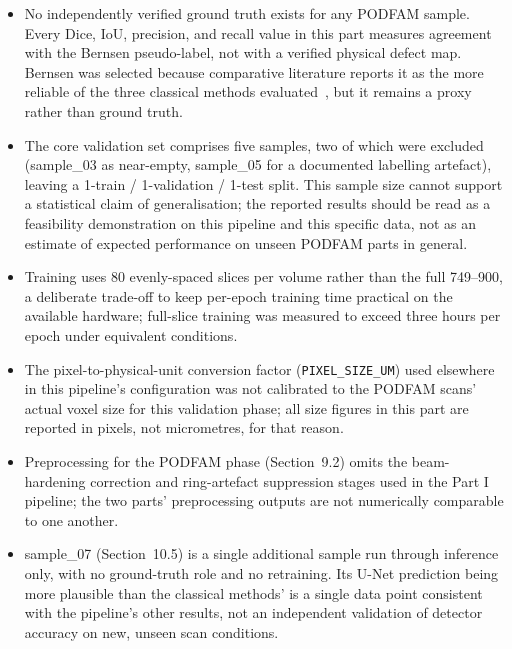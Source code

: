 
\begin{itemize}
\item No independently verified ground truth exists for any PODFAM sample. Every Dice, IoU,
  precision, and recall value in this part measures agreement with the Bernsen pseudo-label, not
  with a verified physical defect map. Bernsen was selected because comparative literature reports
  it as the more reliable of the three classical methods evaluated~\citep{Kim2017}, but it remains a
  proxy rather than ground truth.
\item The core validation set comprises five samples, two of which were excluded (sample\_03 as
  near-empty, sample\_05 for a documented labelling artefact), leaving a 1-train / 1-validation /
  1-test split. This sample size cannot support a statistical claim of generalisation; the reported
  results should be read as a feasibility demonstration on this pipeline and this specific data, not
  as an estimate of expected performance on unseen PODFAM parts in general.
\item Training uses 80 evenly-spaced slices per volume rather than the full 749--900, a deliberate
  trade-off to keep per-epoch training time practical on the available hardware; full-slice training
  was measured to exceed three hours per epoch under equivalent conditions.
\item The pixel-to-physical-unit conversion factor (\texttt{PIXEL\_SIZE\_UM}) used elsewhere in this
  pipeline's configuration was not calibrated to the PODFAM scans' actual voxel size for this
  validation phase; all size figures in this part are reported in pixels, not micrometres, for that
  reason.
\item Preprocessing for the PODFAM phase (Section~9.2) omits the beam-hardening correction and
  ring-artefact suppression stages used in the Part I pipeline; the two parts' preprocessing outputs
  are not numerically comparable to one another.
\item sample\_07 (Section~10.5) is a single additional sample run through inference only, with no
  ground-truth role and no retraining. Its U-Net prediction being more plausible than the classical
  methods' is a single data point consistent with the pipeline's other results, not an independent
  validation of detector accuracy on new, unseen scan conditions.
\end{itemize}
